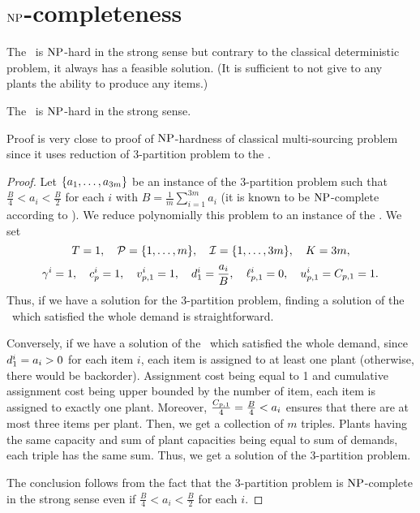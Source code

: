 \section{$\operatorname{NP}$-completeness}


The \tbc\ is $\operatorname{NP}$-hard in the strong sense but contrary to the classical deterministic problem, it always has a feasible solution.
(It is sufficient to not give to any plants the ability to produce any items.)


\begin{thm}\label{thm:det-multi-sourcing:limited-capital:strong-NP-hard}
  The \tbc\ is $\operatorname{NP}$-hard in the strong sense.
\end{thm}


Proof is very close to proof of $\operatorname{NP}$-hardness of classical multi-sourcing problem since it uses reduction of 3-partition problem to the \tbc.


\begin{proof}
Let $\crbracket{a_1,\ldots,a_{3m}}$ be an instance of the 3-partition problem such that $\frac{B}{4} < a_i < \frac{B}{2}$ for each $i$ with $B=\frac{1}{m}\sum_{i=1}^{3m}a_i$ (it is known to be $\operatorname{NP}$-complete according to \cite{Garey1979}).
We reduce polynomially this problem to an instance of the \tbc.
We set
$$
  \horizon=1
  ,\quad
  \plants=\range[1]{m}
  ,\quad
  \REF=\range[1]{3m}
  ,\quad
  \capital = 3m,
$$
$$
  \gamma^i=1
  ,\quad
  c_p^i=1
  ,\quad
  v_{p,1}^i=1
  ,\quad
  d_1^i=\frac{a_i}{B}
  ,\quad
  \ell_{p,1}^i=0
  ,\quad
  u_{p,1}^i=C_{p,1}=1.
$$
Thus, if we have a solution for the 3-partition problem, finding a solution of the \tbc\ which satisfied the whole demand is straightforward.

Conversely, if we have a solution of the \tbc\ which satisfied the whole demand, since $d_1^i=a_i>0$ for each item $i$, each item is assigned to at least one plant (otherwise, there would be backorder).
Assignment cost being equal to 1 and cumulative assignment cost being upper bounded by the number of item, each item is assigned to exactly one plant.
Moreover, $\frac{C_{p,1}}{4}=\frac{B}{4} < a_i$ ensures that there are at most three items per plant.
Then, we get a collection of $m$ triples.
Plants having the same capacity and sum of plant capacities being equal to sum of demands, each triple has the same sum.
Thus, we get a solution of the 3-partition problem.

The conclusion follows from the fact that the 3-partition problem is $\operatorname{NP}$-complete in the strong sense even if $\frac{B}{4} < a_i < \frac{B}{2}$ for each $i$.
\end{proof}


